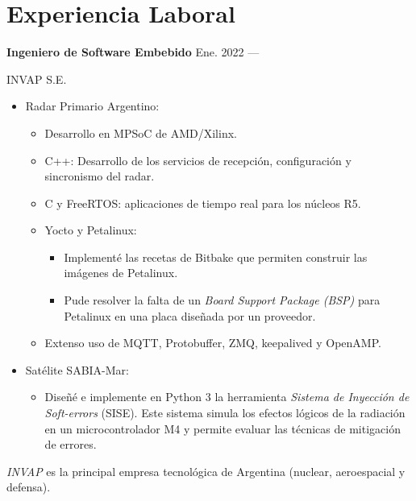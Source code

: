 \section{Experiencia Laboral}


\parbox[t][][t]{\linewidth}{
	\parbox{\linewidth}{
		\textbf{Ingeniero de Software Embebido}
			\hfill
			{Ene. 2022 --- \phantom{Dic. 2099}}
		}
	\smallbreak
	\parbox{\linewidth}{INVAP S.E.}
	\smallbreak
	\begin{itemize}
		\item Radar Primario Argentino:
		\begin{itemize}
	    	\item{Desarrollo en MPSoC de AMD/Xilinx.}
			\item{C++: Desarrollo de los servicios de recepción, configuración y sincronismo del radar.}
			\item{C y FreeRTOS: aplicaciones de tiempo real para los núcleos R5.}
			\item{Yocto y Petalinux:}
			\begin{itemize}
				\item{Implementé las recetas de Bitbake que permiten construir las imágenes de Petalinux.}
				\item{Pude resolver la falta de un \emph{Board Support Package (BSP)} para Petalinux en una placa diseñada por un proveedor.}
			\end{itemize}
			\item{Extenso uso de MQTT, Protobuffer, ZMQ, keepalived y OpenAMP.}
		\end{itemize}
		\item Satélite SABIA-Mar:
		\begin{itemize}
	    	\item{Diseñé e implemente en Python 3 la herramienta \emph{Sistema de Inyección de Soft-errors} (SISE). Este sistema simula los efectos lógicos de la radiación en un microcontrolador M4 y permite evaluar las técnicas de mitigación de errores.}
		\end{itemize}
	\end{itemize}
	\smallbreak
    \emph{INVAP} es la principal empresa tecnológica de Argentina (nuclear, aeroespacial y defensa).
}

